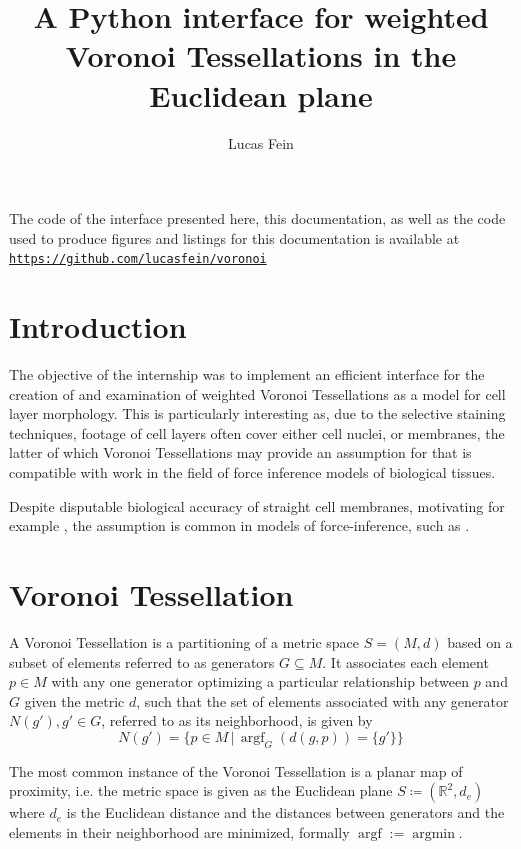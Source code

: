 \documentclass[a4paper]{article}
\title{A Python interface for weighted Voronoi Tessellations in the Euclidean plane}
\author{Lucas Fein}
\DeclareMathOperator*{\argf}{argf}
\DeclareMathOperator*{\argmin}{argmin}
\begin{document}
\maketitle
\vfill
\tableofcontents
\begin{center}
	The code of the interface presented here, this documentation, as well as the code used to produce figures and listings
	for this documentation is available at
	\href{https://github.com/lucasfein/voronoi}{\texttt{https://github.com/lucasfein/voronoi}}
\end{center}
\thispagestyle{empty}
\pagebreak

\setcounter{page}{1}
\section{Introduction}
The objective of the internship was to implement an efficient interface for the creation of and examination of
weighted Voronoi Tessellations as a model for cell layer morphology. This is particularly interesting as,
due to the selective staining techniques, footage of cell layers often cover either cell nuclei, or membranes,
the latter of which Voronoi Tessellations may provide an assumption for that is compatible with work in the
field of force inference models of biological tissues.

Despite disputable biological accuracy of straight cell membranes,
motivating for example \cite{Bock2010}, the assumption is common in models of force-inference, such as \cite{Ischihara2012}.

\section{Voronoi Tessellation}
A Voronoi Tessellation is a partitioning of a metric space \(S = (M, d)\) based on a subset of elements
referred to as generators \(G \subseteq M\).
It associates each element \(p \in M\) with any one generator optimizing a particular relationship between
\(p\) and \(G\) given the metric \(d\),
such that the set of elements associated with any generator \(N(g'), g' \in G\), referred to as its neighborhood,
is given by \[N(g') = \{p \in M \,|\, \argf_{G} (d(g, p)) = \{g'\}\}\]

The most common instance of the Voronoi Tessellation is a planar map of proximity,
i.e. the metric space is given as the Euclidean plane \(S \coloneqq (\mathbb{R}^2, d_e)\) where \(d_e\)
is the Euclidean distance and the distances between generators and the elements in their neighborhood are minimized,
formally \(\argf := \argmin\).
\end{document}
